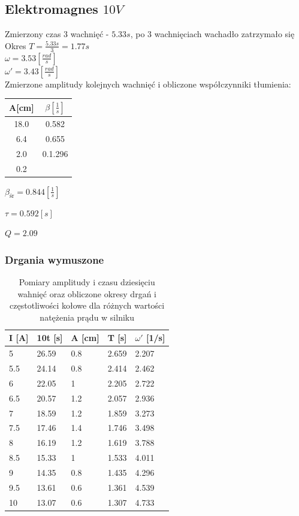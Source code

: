 \documentclass[]{article}
\begin{document}
	\subsection{Elektromagnes $10V$}
	Zmierzony czas 3 wachnięć - $5.33s$, po 3 wachnięciach wachadło zatrzymało się\\
	Okres $T=\frac{5.33s}{3} = 1.77s$\\
	$\omega = 3.53 \left[ \frac{rad}{s}\right]$\\
	$\omega' = 3.43 \left[ \frac{rad}{s}\right]$\\
	Zmierzone amplitudy kolejnych wachnięć i obliczone współczynniki tłumienia:
	\begin{table}[h]
		\begin{tabular}{|c|c|}
			\hline 
			A[cm] & $\beta\left[ \frac{1}{s}\right] $ \\ 
			\hline 
			18.0 & 0.582 \\ 
			\hline 
			6.4 & 0.655 \\ 
			\hline 
			2.0 & 0.1.296 \\ 
			\hline 
			0.2 &  \\ 
			\hline 
		\end{tabular} 
	\end{table}
	
	$\beta_{\text{śr}} = 0.844 \left[ \frac{1}{s}\right] $
	
	$\tau=0.592[s]$
	
	$Q = 2.09$
	
	\subsubsection{Drgania wymuszone}
	
	\begin{table}[h]
		\centering
		\caption{Pomiary amplitudy i czasu dziesięciu wahnięć oraz obliczone okresy drgań i częstotliwości kołowe dla różnych wartości natężenia prądu w silniku}
		\begin{tabular}{|l|l|l|l|l|}
			\hline
			
			I [A] & 10t [s] & A [cm] & T [s] & $\omega'$ [1/s] \\ \hline
			5 & 26.59 & 0.8 & 2.659 & 2.207 \\ \hline
			5.5 & 24.14 & 0.8 & 2.414 & 2.462 \\ \hline
			6 & 22.05 & 1 & 2.205 & 2.722 \\ \hline
			6.5 & 20.57 & 1.2 & 2.057 & 2.936 \\ \hline
			7 & 18.59 & 1.2 & 1.859 & 3.273 \\ \hline
			7.5 & 17.46 & 1.4 & 1.746 & 3.498 \\ \hline
			8 & 16.19 & 1.2 & 1.619 & 3.788 \\ \hline
			8.5 & 15.33 & 1 & 1.533 & 4.011 \\ \hline
			9 & 14.35 & 0.8 & 1.435 & 4.296 \\ \hline
			9.5 & 13.61 & 0.6 & 1.361 & 4.539 \\ \hline
			10 & 13.07 & 0.6 & 1.307 & 4.733 \\ \hline
			
			
		\end{tabular}
	\end{table}
		
\end{document}
